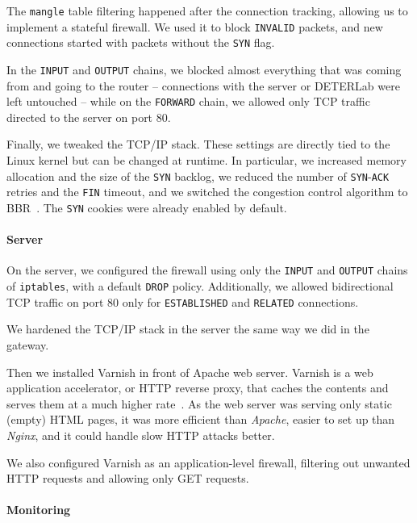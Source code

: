 The \texttt{mangle} table filtering happened after the connection tracking, allowing us to implement a stateful firewall. We used it to block \texttt{INVALID} packets, and new connections started with packets without the \texttt{SYN} flag.

In the \texttt{INPUT} and \texttt{OUTPUT} chains, we blocked almost everything that was coming from and going to the router -- connections with the server or DETERLab were left untouched -- while on the \texttt{FORWARD} chain, we allowed only TCP traffic directed to the server on port 80.

Finally, we tweaked the TCP/IP stack. These settings are directly tied to the Linux kernel but can be changed at runtime. In particular, we increased memory allocation and the size of the \texttt{SYN} backlog, we reduced the number of \texttt{SYN}-\texttt{ACK} retries and the \texttt{FIN} timeout, and we switched the congestion control algorithm to BBR~\cite{bbr}. The \texttt{SYN} cookies were already enabled by default.

\paragraph{Server}
\label{sec:cctf-resilient:def-prep:server}

On the server, we configured the firewall using only the \texttt{INPUT} and \texttt{OUTPUT} chains of \texttt{iptables}, with a default \texttt{DROP} policy. Additionally, we allowed bidirectional TCP traffic on port 80 only for \texttt{ESTABLISHED} and \texttt{RELATED} connections.

We hardened the TCP/IP stack in the server the same way we did in the gateway.

Then we installed Varnish in front of Apache web server. Varnish is a web application accelerator, or HTTP reverse proxy, that caches the contents and serves them at a much higher rate~\cite{varnish}. As the web server was serving only static (empty) HTML pages, it was more efficient than \textit{Apache}, easier to set up than \textit{Nginx}, and it could handle slow HTTP attacks better.

We also configured Varnish as an application-level firewall, filtering out unwanted HTTP requests and allowing only GET requests.

\paragraph{Monitoring}
\label{sec:cctf-resilient:def-prep:monitoring}

